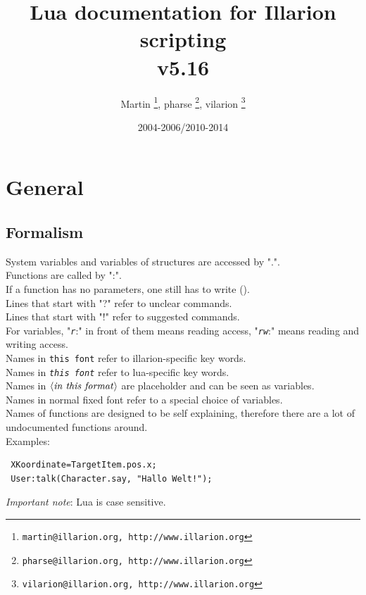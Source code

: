 \documentclass[a4paper,10pt,makeidx]{scrreprt}
\newcommand{\comm}[1]{\index{#1}\texttt{#1}}
\newcommand{\var}[1]{$\left\langle \text{\emph{#1}} \right\rangle$}
\newcommand{\lua}[1]{\index{#1}\texttt{\emph{#1}}}
\begin{document}
\lstset{basicstyle=\small, keywordstyle=\ttfamily, identifierstyle=\ttfamily}
\title{Lua documentation for Illarion scripting\\v5.16}
\author{Martin \thanks{ \texttt{martin@illarion.org, http://www.illarion.org}},
pharse \thanks{ \texttt{pharse@illarion.org, http://www.illarion.org}},
vilarion \thanks{ \texttt{vilarion@illarion.org, http://www.illarion.org}}}
\date{2004-2006/2010-2014}
\maketitle
\tableofcontents
\chapter{General}
\section{Formalism}
System variables and variables of structures are accessed by ".".\\
Functions are called by ":".\\
If a function has no parameters, one still has to write ().\\
Lines that start with "?" refer to unclear commands.\\
Lines that start with "!" refer to suggested commands.\\
For variables, "\lua{r}:" in front of them means reading access, "\lua{rw}:" means reading and writing access.\\
Names in \comm{this font} refer to illarion-specific key words.\\
Names in \lua{this font} refer to lua-specific key words.\\
Names in \var{in this format} are placeholder and can be seen as variables.\\
Names in normal fixed font refer to a special choice of variables.\\
Names of functions are designed to be self explaining, therefore there are a lot of undocumented functions around.\\

Examples:\\
\begin{verbatim}
 XKoordinate=TargetItem.pos.x;
 User:talk(Character.say, "Hallo Welt!");
\end{verbatim}
\emph{Important note}: Lua is case sensitive.
\end{document}
